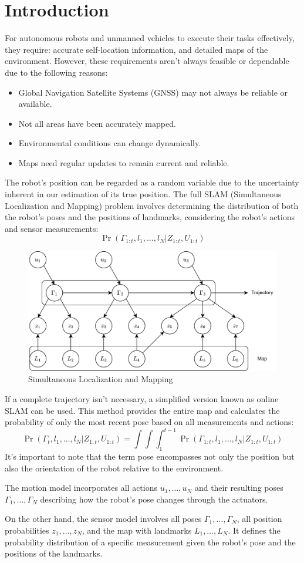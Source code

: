 \section{Introduction}

For autonomous robots and unmanned vehicles to execute their tasks effectively, they require: accurate self-location information, and detailed maps of the environment.
However, these requirements aren't always feasible or dependable due to the following reasons:
\begin{itemize}
    \item Global Navigation Satellite Systems (GNSS) may not always be reliable or available.
    \item Not all areas have been accurately mapped.
    \item Environmental conditions can change dynamically.
    \item Maps need regular updates to remain current and reliable.
\end{itemize}

The robot's position can be regarded as a random variable due to the uncertainty inherent in our estimation of its true position.
The full SLAM (Simultaneous Localization and Mapping) problem involves determining the distribution of both the robot's poses and the positions of landmarks, considering the robot's actions and sensor measurements: 
\[\Pr\left(\Gamma_{1:t},l_1,\dots,l_N|Z_{1:t},U_{1:t}\right)\]
\begin{figure}[H]
    \centering
    \includegraphics[width=0.75\linewidth]{images/slam.png}
    \caption{Simultaneous Localization and Mapping}
\end{figure}
If a complete trajectory isn't necessary, a simplified version known as online SLAM can be used. 
This method provides the entire map and calculates the probability of only the most recent pose based on all measurements and actions: 
\[\Pr\left(\Gamma_{t},l_1,\dots,l_N|Z_{1:t},U_{1:t}\right)=\int\int\int_{1}^{t-1}\Pr\left(\Gamma_{1:t},l_1,\dots,l_N|Z_{1:t},U_{1:t}\right)\]
It's important to note that the term pose encompasses not only the position but also the orientation of the robot relative to the environment.

The motion model incorporates all actions $u_1,\dots,u_N$ and their resulting poses $\Gamma_1,\dots,\Gamma_N$ describing how the robot's pose changes through the actuators.

On the other hand, the sensor model involves all poses $\Gamma_1,\dots,\Gamma_N$, all position probabilities $z_1,\dots,z_N$, and the map with landmarks $L_1,\dots,L_N$. 
It defines the probability distribution of a specific measurement given the robot's pose and the positions of the landmarks.